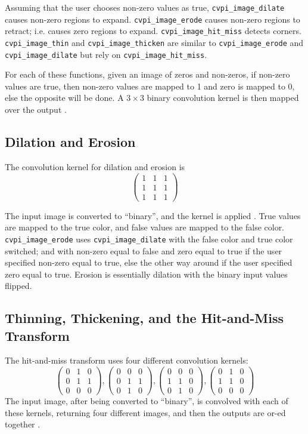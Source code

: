 \documentclass[12pt]{report}
\def\byX {\!\!\times\!\!}
\begin{document}
Assuming that the user chooses non-zero values as true,
{\tt cvpi\_image\_dilate} causes non-zero regions to
expand. {\tt cvpi\_image\_erode} causes non-zero regions to retract;
i.e. causes zero regions to expand. {\tt cvpi\_image\_\-hit\_miss} detects
corners. {\tt cvpi\_image\_thin} and {\tt cvpi\_image\_thicken} are similar to
{\tt cvpi\_image\_erode} and {\tt cvpi\_image\_dilate} but rely on
{\tt cvpi\_image\_\-hit\_miss}.

For each of these functions, given an image of zeros and non-zeros,
if non-zero values are true, then non-zero values are mapped to 1
and zero is mapped to 0, else the opposite will be done. A
$3\byX 3$ binary convolution kernel is then mapped over the output \cite[Morphology]{HIPR2}.
\subsection{Dilation and Erosion}
\label{sec-3-13-1}
The convolution kernel for dilation and erosion is
\[%
\begin{pmatrix} 1 & 1 & 1 \\ 1 & 1 & 1 \\ 1 & 1 & 1 \end{pmatrix}\]

The input image is converted to ``binary'', and the kernel is applied
\cite[Morphology]{HIPR2}. True values are mapped to the true color,
and false values are mapped to the false color. {\tt
  cvpi\_image\_erode} uses {\tt cvpi\_image\_dilate} with the false
color and true color switched; and with non-zero equal to false and
zero equal to true if the user specified non-zero equal to true, else
the other way around if the user specified zero equal to true. Erosion
is essentially dilation with the binary input values flipped.

\subsection{Thinning, Thickening, and the Hit-and-Miss Transform}
\label{sec-3-13-2}
The hit-and-miss transform uses four different convolution
kernels:
\[\begin{pmatrix} 0 & 1 & 0 \\ 0 & 1 & 1 \\ 0 & 0 & 0\end{pmatrix},
\begin{pmatrix} 0 & 0 & 0 \\ 0 & 1 & 1 \\ 0 & 1 & 0\end{pmatrix},
\begin{pmatrix} 0 & 0 & 0 \\ 1 & 1 & 0 \\ 0 & 1 & 0\end{pmatrix},
\begin{pmatrix} 0 & 1 & 0 \\ 1 & 1 & 0 \\ 0 & 0 & 0\end{pmatrix}\] The
input image, after being converted to ``binary'', is convolved with
each of these kernels, returning four different images, and then the
outputs are or-ed together \cite[Morphology]{HIPR2}.
\end{document}
